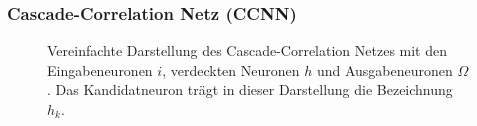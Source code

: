 
\subsubsection{Cascade-Correlation Netz (CCNN)}%
\begin{figure}[!htb]
        
    \caption[Darstellung eines CCNN]{Vereinfachte Darstellung des Cascade-Correlation Netzes mit den Eingabeneuronen $i$, verdeckten Neuronen $h$ und Ausgabeneuronen $\Omega$. Das Kandidatneuron trägt in dieser Darstellung die Bezeichnung $h_k$.\,\protect\footnotemark{}}
    \label{fig:ccnn}
\end{figure}
\addtocounter{footnote}{-1}     %
\addtocounter{Hfootnote}{-1}    %
\wrapfigfoot{}

